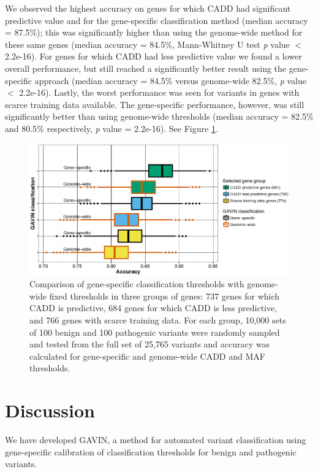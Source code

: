 We observed the highest accuracy on genes for which CADD had significant predictive value and for the gene-specific classification method (median accuracy = 87.5\%);
this was significantly higher than using the genome-wide method for these same genes (median accuracy = 84.5\%, Mann-Whitney U test \textsl{p} value $<$ 2.2e-16).
For genes for which CADD had less predictive value we found a lower overall performance, but still reached a significantly better result using the gene-specific approach (median accuracy = 84.5\% versus genome-wide 82.5\%, \textsl{p} value $<$ 2.2e-16).
Lastly, the worst performance was seen for variants in genes with scarce training data available.
The gene-specific performance, however, was still significantly better than using genome-wide thresholds (median accuracy = 82.5\% and 80.5\% respectively, \textsl{p} value = 2.2e-16).
See Figure \ref{fig:gavin_bootstrap}.


\begin{figure}
	\includegraphics[width=1.0\linewidth]{img/gavin_bootstrap}
	\caption[Comparison of gene-specific thresholds]{Comparison of gene-specific classification thresholds with genome-wide fixed thresholds in three groups of genes: 737 genes for which CADD is predictive, 684 genes for which CADD is less predictive, and 766 genes with scarce training data. For each group, 10,000 sets of 100 benign and 100 pathogenic variants were randomly sampled and tested from the full set of 25,765 variants and accuracy was calculated for gene-specific and genome-wide CADD and MAF thresholds.}
	\label{fig:gavin_bootstrap}
\end{figure}


\section{Discussion}

We have developed GAVIN, a method for automated variant classification using gene-specific calibration of classification thresholds for benign and pathogenic variants.

